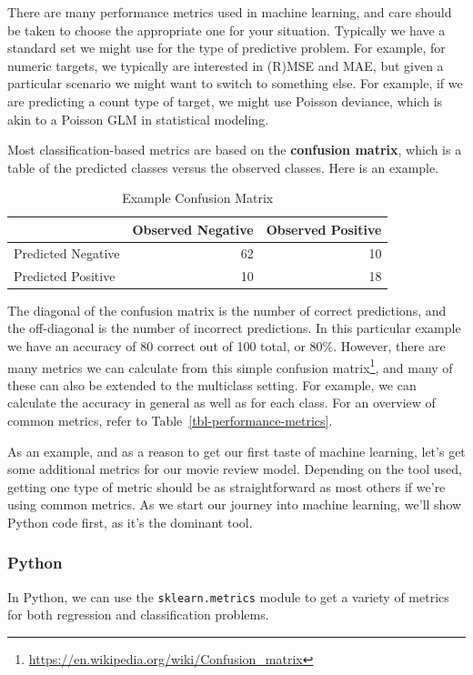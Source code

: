 \documentclass[
  letterpaper,
]{krantz}
\DeclareRobustCommand{\href}[2]{#2\footnote{\url{#1}}}
\begin{document}
There are many performance metrics used in machine learning, and care
should be taken to choose the appropriate one for your situation.
Typically we have a standard set we might use for the type of predictive
problem. For example, for numeric targets, we typically are interested
in (R)MSE and MAE, but given a particular scenario we might want to
switch to something else. For example, if we are predicting a count type
of target, we might use Poisson deviance, which is akin to a Poisson GLM
in statistical modeling.

Most classification-based metrics are based on the \textbf{confusion
matrix}, which is a table of the predicted classes versus the observed
classes. Here is an example.

\begin{longtable}{lrr}
\caption{Example Confusion Matrix}\tabularnewline

\toprule
  & Observed Negative & Observed Positive \\ 
\midrule\addlinespace[2.5pt]
Predicted Negative & 62 & 10 \\ 
Predicted Positive & 10 & 18 \\ 
\bottomrule
\end{longtable}

The diagonal of the confusion matrix is the number of correct
predictions, and the off-diagonal is the number of incorrect
predictions. In this particular example we have an accuracy of 80
correct out of 100 total, or 80\%. However, there are
\href{https://en.wikipedia.org/wiki/Confusion_matrix}{many metrics we
can calculate from this simple confusion matrix}, and many of these can
also be extended to the multiclass setting. For example, we can
calculate the accuracy in general as well as for each class. For an
overview of common metrics, refer to
Table~\ref{tbl-performance-metrics}.

As an example, and as a reason to get our first taste of machine
learning, let's get some additional metrics for our movie review model.
Depending on the tool used, getting one type of metric should be as
straightforward as most others if we're using common metrics. As we
start our journey into machine learning, we'll show Python code first,
as it's the dominant tool.

\subsubsection{Python}

In Python, we can use the \texttt{sklearn.metrics} module to get a
variety of metrics for both regression and classification problems.
\end{document}
